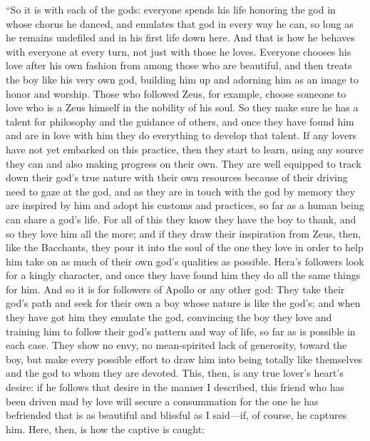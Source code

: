 “So it is with each of the gods: everyone spends his life
honoring the god in whose chorus he danced, and emulates that god in
every way he can, so long as he remains undefiled and in his first life
down here. And that is how he behaves with everyone at every turn, not
just with those he loves. Everyone chooses his love after his own
fashion from among those who are beautiful, and then treats the
boy like his very own god, building him up and adorning him as an image
to honor and worship. Those who followed Zeus, for example, choose
someone to love who is a Zeus himself in the nobility of his soul. So
they make sure he has a talent for philosophy and the guidance of
others, and once they have found him and are in love with him they do
everything to develop that talent. If any lovers have not yet embarked
on this practice, then they start to learn, using any source they can
and also making progress on their own. They are well equipped to track
down their god's true nature with their own resources
because of their driving need to gaze at the god, and as they are in
touch with the god by memory they are inspired by him and adopt his
customs and practices, so far as a human being can share a god's life.
For all of this they know they have the boy to thank, and so they love
him all the more; and if they draw their inspiration from Zeus, then,
like the Bacchants,
they pour it into the soul of the one they love in order to help
him take on as much of their own god's qualities as possible. Hera's
followers look for a kingly character, and once they have found him they
do all the same things for him. And so it is for followers of Apollo or
any other god: They take their god's path and seek for their own a boy
whose nature is like the god's; and when they have got him they emulate
the god, convincing the boy they love and training him to follow their
god's pattern and way of life, so far as is possible in each case. They
show no envy, no mean-spirited lack of generosity, toward the boy, but
make every possible effort to draw him into being totally like
themselves and the god to whom they are devoted. This, then, is any true
lover's heart's desire: if he follows that desire in the manner I
described, this friend who has been driven mad by love will secure a
consummation for the
one he has befriended that is as beautiful and blissful as I said---if,
of course, he captures him. Here, then, is how the captive is caught:

